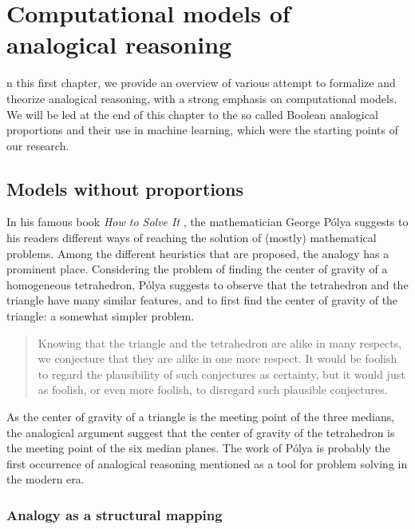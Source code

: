 \chapter{Computational models of analogical reasoning}
\label{CHAP:chapter_1}


n this first chapter, we provide an overview of various attempt to
formalize and theorize analogical reasoning, with a strong emphasis on
computational models. We will be led at the end of this chapter to the so
called Boolean analogical proportions and their use in machine learning, which
were the starting points of our research.

\section{Models without proportions}
\label{sec:models_without_proportions}

In his famous book \textit{How to Solve It} \cite{Pol45}, the mathematician
George P\'olya suggests to his readers different ways of reaching the solution
of (mostly) mathematical problems. Among the different heuristics that are
proposed, the analogy has a prominent place. Considering the problem of finding
the center of gravity of a homogeneous tetrahedron, P\'olya suggests to observe
that the tetrahedron and the triangle have many similar features, and to first
find the center of gravity of the triangle: a somewhat simpler problem.

\begin{quote}
Knowing that the triangle and the tetrahedron are alike in many respects, we
  conjecture that they are alike in one more respect. It would be foolish to
  regard the plausibility of such conjectures as certainty, but it would just
  as foolish, or even more foolish, to disregard such plausible conjectures.
\end{quote}

As the center of gravity of a triangle is the meeting point of the three
medians, the analogical argument suggest that the center of gravity of the
tetrahedron is the meeting point of the six median planes. The work of P\'olya
is probably the first occurrence of analogical reasoning mentioned as a tool for
problem solving in the modern era.

\subsection{Analogy as a structural mapping}


